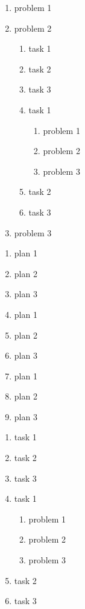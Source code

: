 \documentclass{weekly}
\begin{document}
    \thisweekproblem
        \begin{enumerate}
            \item problem 1
            \item problem 2
              \begin{enumerate}
              \item task 1
              \item task 2
              \item task 3
              \item task 1
                \begin{enumerate}
                \item problem 1
                \item problem 2
                \item problem 3
                \end{enumerate}
              \item task 2
              \item task 3
              \end{enumerate}
            \item problem 3
            \end{enumerate}
    \nextweekplan
        \begin{enumerate}
            \item plan 1
            \item plan 2
            \item plan 3
            \item plan 1
            \item plan 2
            \item plan 3
            \item plan 1
            \item plan 2
            \item plan 3
        \end{enumerate}
    \thisweektask
    \begin{enumerate}
        \item task 1
        \item task 2
        \item task 3
        \item task 1
        \begin{enumerate}
            \item problem 1
            \item problem 2
            \item problem 3
        \end{enumerate}
        \item task 2
        \item task 3
    \end{enumerate}
\end{document}
